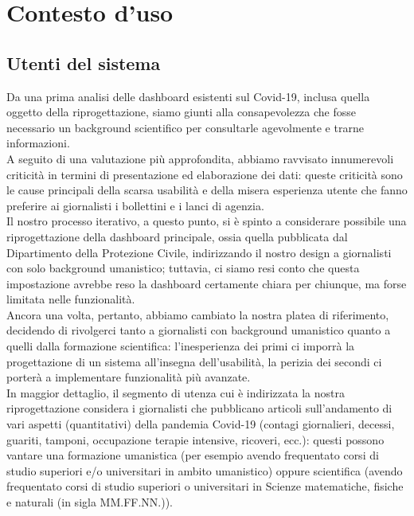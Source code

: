 \section{Contesto d'uso}
\subsection{Utenti del sistema}
Da una prima analisi delle dashboard esistenti sul Covid-19, inclusa quella oggetto della riprogettazione, siamo giunti alla consapevolezza che fosse necessario un background scientifico per consultarle agevolmente e trarne informazioni.\\
A seguito di una valutazione più approfondita, abbiamo ravvisato innumerevoli criticità in termini di presentazione ed elaborazione dei dati: queste criticità sono le cause principali della scarsa usabilità e della misera esperienza utente che  fanno preferire ai giornalisti i bollettini e i lanci di agenzia.\\
Il nostro processo iterativo, a questo punto, si è spinto a considerare possibile una riprogettazione della dashboard principale, ossia quella pubblicata dal Dipartimento della Protezione Civile, indirizzando il nostro design a giornalisti con solo background umanistico; tuttavia, ci siamo resi conto che questa impostazione avrebbe reso la dashboard certamente chiara per chiunque, ma forse limitata nelle funzionalità.\\ 
Ancora una volta, pertanto, abbiamo cambiato la nostra platea di riferimento, decidendo di rivolgerci tanto a giornalisti con background umanistico quanto a quelli dalla formazione scientifica: l'inesperienza dei primi ci imporrà la progettazione di un sistema all'insegna dell'usabilità, la perizia dei secondi ci porterà a implementare funzionalità più avanzate.\\
In maggior dettaglio, il segmento di utenza cui è indirizzata la nostra riprogettazione considera i giornalisti che pubblicano articoli sull'andamento di vari aspetti (quantitativi) della pandemia Covid-19 (contagi giornalieri, decessi, guariti, tamponi, occupazione terapie intensive, ricoveri, ecc.): questi possono vantare una formazione umanistica (per esempio avendo frequentato corsi di studio superiori e/o universitari in ambito umanistico) oppure scientifica (avendo frequentato corsi di studio superiori o universitari in Scienze matematiche, fisiche e naturali (in sigla MM.FF.NN.)).

